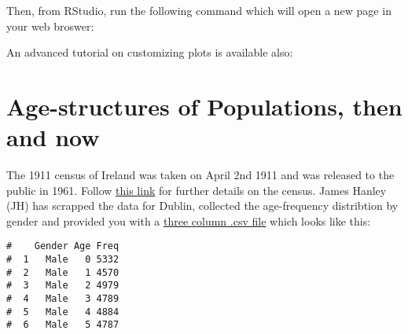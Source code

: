 \documentclass[letterpaper,9pt,twoside,printwatermark=false]{pinp}
\begin{document}
Then, from RStudio, run the following command which will open a new page
in your web broswer:

\begin{Shaded}
\begin{Highlighting}[]
\OperatorTok{::}\NormalTok{(}\NormalTok{, } \NormalTok{)}
\end{Highlighting}
\end{Shaded}

An advanced tutorial on customizing plots is available also:

\begin{Shaded}
\begin{Highlighting}[]
\OperatorTok{::}\NormalTok{(}\NormalTok{, } \NormalTok{)}
\end{Highlighting}
\end{Shaded}

\section{Age-structures of Populations, then and
now}\label{age-structures-of-populations-then-and-now}

The 1911 census of Ireland was taken on April 2nd 1911 and was released
to the public in 1961. Follow
\href{http://www.census.nationalarchives.ie/help/about19011911census.html}{this
link} for further details on the census. James Hanley (JH) has scrapped
the data for Dublin, collected the age-frequency distribtion by gender
and provided you with a
\href{https://github.com/sahirbhatnagar/EPIB607/raw/master/data/age_sex_frequencies_ireland.csv}{three
column .csv file} which looks like this:

\begin{Shaded}
\begin{Highlighting}[]
\StringTok{ }\NormalTok{(}\NormalTok{)}
\end{Highlighting}
\end{Shaded}

\begin{ShadedResult}
\begin{verbatim}
#    Gender Age Freq
#  1   Male   0 5332
#  2   Male   1 4570
#  3   Male   2 4979
#  4   Male   3 4789
#  5   Male   4 4884
#  6   Male   5 4787
\end{verbatim}
\end{ShadedResult}
\end{document}
